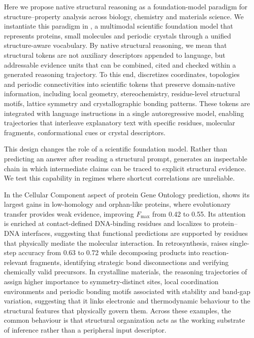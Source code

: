 Here we propose native structural reasoning as a foundation-model paradigm for structure--property analysis across biology, chemistry and materials science. We instantiate this paradigm in \projName{}, a multimodal scientific foundation model that represents proteins, small molecules and periodic crystals through a unified structure-aware vocabulary. By native structural reasoning, we mean that structural tokens are not auxiliary descriptors appended to language, but addressable evidence units that can be combined, cited and checked within a generated reasoning trajectory. To this end, \projName{} discretizes coordinates, topologies and periodic connectivities into scientific tokens that preserve domain-native information, including local geometry, stereochemistry, residue-level structural motifs, lattice symmetry and crystallographic bonding patterns. These tokens are integrated with language instructions in a single autoregressive model, enabling trajectories that interleave explanatory text with specific residues, molecular fragments, conformational cues or crystal descriptors.


This design changes the role of a scientific foundation model. Rather than predicting an answer after reading a structural prompt, \projName{} generates an inspectable chain in which intermediate claims can be traced to explicit structural evidence. 
We test this capability in regimes where shortcut correlations are unreliable. 
 
In the Cellular Component aspect of protein Gene Ontology prediction, \projName{} shows its largest gains in low-homology and orphan-like proteins, where evolutionary transfer provides weak evidence, improving $F_{\max}$ from 0.42 to 0.55.
Its attention is enriched at contact-defined DNA-binding residues and localizes to protein--DNA interfaces, suggesting that functional predictions are supported by residues that physically mediate the molecular interaction. 
In retrosynthesis, \projName{} raises single-step accuracy from 0.63 to 0.72 while decomposing products into reaction-relevant fragments, identifying strategic bond disconnections and verifying chemically valid precursors. 
In crystalline materials, the reasoning trajectories of \projName{} assign higher importance to symmetry-distinct sites, local coordination environments and periodic bonding motifs associated with stability and band-gap variation, suggesting that it links electronic and thermodynamic behaviour to the structural features that physically govern them. 
Across these examples, the common behaviour is that structural organization acts as the working substrate of inference rather than a peripheral input descriptor.

